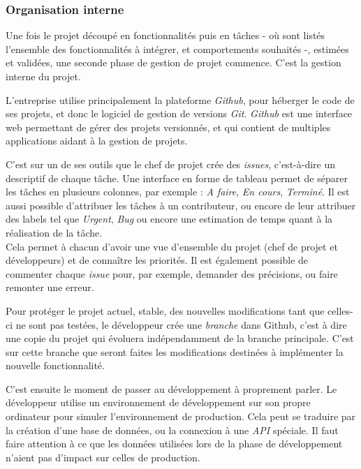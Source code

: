 \bigskip

\subsubsection{Organisation interne}\label{organisation-interne}

\bigskip

Une fois le projet découpé en fonctionnalités puis en tâches - où sont
listés l'ensemble des fonctionnalités à intégrer, et comportements
souhaités -, estimées et validées, une seconde phase de gestion de
projet commence. C'est la gestion interne du projet.

L'entreprise utilise principalement la plateforme \emph{Github}, pour
héberger le code de ses projets, et donc le logiciel de gestion de
versions \emph{Git}. \emph{Github} est une interface web permettant de
gérer des projets versionnés, et qui contient de multiples applications
aidant à la gestion de projets.

\bigskip

C'est sur un de ses outils que le chef de projet crée des \emph{issues},
c'est-à-dire un descriptif de chaque tâche. Une interface en forme de
tableau permet de séparer les tâches en plusieurs colonnes, par exemple
: \emph{A faire}, \emph{En cours}, \emph{Terminé}. Il est aussi possible
d'attribuer les tâches à un contributeur, ou encore de leur attribuer
des labels tel que \emph{Urgent}, \emph{Bug} ou encore une estimation de
temps quant à la réalisation de la tâche.\\
Cela permet à chacun d'avoir une vue d'ensemble du projet (chef de
projet et développeurs) et de connaître les priorités. Il est également
possible de commenter chaque \emph{issue} pour, par exemple, demander
des précisions, ou faire remonter une erreur.

\bigskip

Pour protéger le projet actuel, stable, des nouvelles modifications tant
que celles-ci ne sont pas testées, le développeur crée une
\emph{branche} dans Github, c'est à dire une copie du projet qui
évoluera indépendamment de la branche principale. C'est sur cette
branche que seront faites les modifications destinées à implémenter la
nouvelle fonctionnalité.

\bigskip

C'est ensuite le moment de passer au développement à proprement parler.
Le développeur utilise un environnement de développement sur son propre
ordinateur pour simuler l'environnement de production. Cela peut se
traduire par la création d'une base de données, ou la connexion à une
\emph{API} spéciale. Il faut faire attention à ce que les données
utilisées lors de la phase de développement n'aient pas d'impact sur
celles de production.

